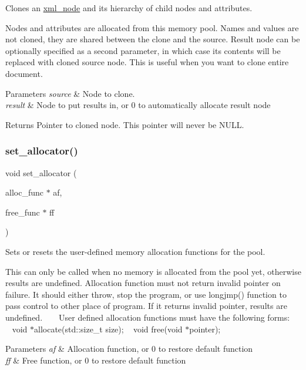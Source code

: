 Clones an \mbox{\hyperlink{classrapidxml_1_1xml__node}{xml\+\_\+node}} and its hierarchy of child nodes and attributes. 

Nodes and attributes are allocated from this memory pool. Names and values are not cloned, they are shared between the clone and the source. Result node can be optionally specified as a second parameter, in which case its contents will be replaced with cloned source node. This is useful when you want to clone entire document. 
\begin{DoxyParams}{Parameters}
{\em source} & Node to clone. \\
\hline
{\em result} & Node to put results in, or 0 to automatically allocate result node \\
\hline
\end{DoxyParams}
\begin{DoxyReturn}{Returns}
Pointer to cloned node. This pointer will never be N\+U\+LL. 
\end{DoxyReturn}
\mbox{\label{classrapidxml_1_1memory__pool_ac0a55a6ef0837dca67572e357100d78a}} 
\subsubsection{\texorpdfstring{set\+\_\+allocator()}{set\_allocator()}}
{\footnotesize\ttfamily void set\+\_\+allocator (\begin{DoxyParamCaption}\item[{alloc\+\_\+func $\ast$}]{af,  }\item[{free\+\_\+func $\ast$}]{ff }\end{DoxyParamCaption})\hspace{0.3cm}{\ttfamily [inline]}}



Sets or resets the user-\/defined memory allocation functions for the pool. 

This can only be called when no memory is allocated from the pool yet, otherwise results are undefined. Allocation function must not return invalid pointer on failure. It should either throw, stop the program, or use {\ttfamily longjmp()} function to pass control to other place of program. If it returns invalid pointer, results are undefined. ~\newline
~\newline
 User defined allocation functions must have the following forms\+: ~\newline
{\ttfamily  ~\newline
void $\ast$allocate(std\+::size\+\_\+t size); ~\newline
void free(void $\ast$pointer); }~\newline
 
\begin{DoxyParams}{Parameters}
{\em af} & Allocation function, or 0 to restore default function \\
\hline
{\em ff} & Free function, or 0 to restore default function \\
\hline
\end{DoxyParams}
